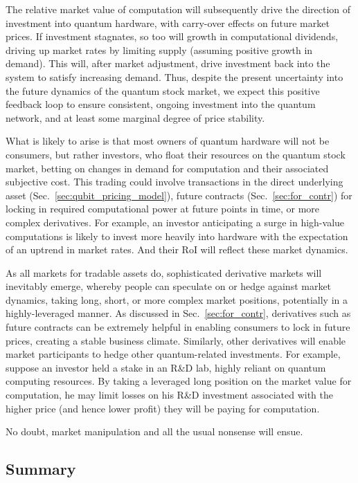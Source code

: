 The relative market value of computation will subsequently drive the direction of investment into quantum hardware, with carry-over effects on future market prices. If investment stagnates, so too will growth in computational dividends, driving up market rates by limiting supply (assuming positive growth in demand). This will, after market adjustment, drive investment back into the system to satisfy increasing demand. Thus, despite the present uncertainty into the future dynamics of the quantum stock market, we expect this positive feedback loop to ensure consistent, ongoing investment into the quantum network, and at least some marginal degree of price stability.

What is likely to arise is that most owners of quantum hardware will not be consumers, but rather investors, who float their resources on the quantum stock market, betting on changes in demand for computation and their associated subjective cost. This trading could involve transactions in the direct underlying asset (Sec.~\ref{sec:qubit_pricing_model}), future contracts (Sec.~\ref{sec:for_contr}) for locking in required computational power at future points in time, or more complex derivatives. For example, an investor anticipating a surge in high-value computations is likely to invest more heavily into hardware with the expectation of an uptrend in market rates. And their RoI will reflect these market dynamics.

As all markets for tradable assets do, sophisticated derivative markets will inevitably emerge, whereby people can speculate on or hedge against market dynamics, taking long, short, or more complex market positions, potentially in a highly-leveraged manner. As discussed in Sec.~\ref{sec:for_contr}, derivatives such as future contracts can be extremely helpful in enabling consumers to lock in future prices, creating a stable business climate. Similarly, other derivatives will enable market participants to hedge other quantum-related investments. For example, suppose an investor held a stake in an R\&D lab, highly reliant on quantum computing resources. By taking a leveraged long position on the market value for computation, he may limit losses on his R\&D investment associated with the higher price (and hence lower profit) they will be paying for computation.

No doubt, market manipulation and all the usual nonsense will ensue.

%
%

\subsection{Summary}

